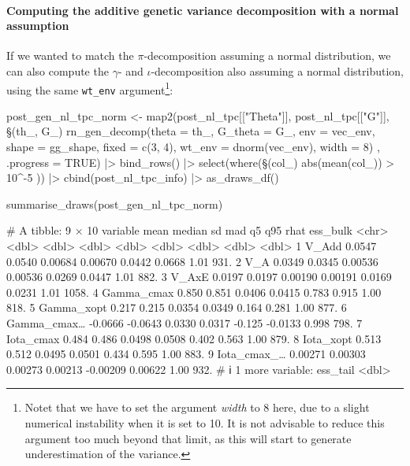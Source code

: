 \documentclass[a4paper,12pt,twoside]{article}
\begin{document}
\paragraph{Computing the additive genetic variance decomposition with a normal assumption}
If we wanted to match the $\pi$-decomposition assuming a normal distribution, we can also compute the $\gamma$- and $\iota$-decomposition also assuming a normal distribution, using the same \texttt{wt\_env} argument\footnote{Notet that we have to set the argument \textit{width} to 8 here, due to a slight numerical instability when it is set to 10. It is not advisable to reduce this argument too much beyond that limit, as this will start to generate underestimation of the variance.}:
\begin{Rinput}
post_gen_nl_tpc_norm <-
    map2(post_nl_tpc[["Theta"]], post_nl_tpc[["G"]],
         \§§(th_, G_) { rn_gen_decomp(theta    = th_,
                                    G_theta  = G_,
                                    env      = vec_env,
                                    shape    = gg_shape,
                                    fixed    = c(3, 4),
                                    wt_env   = dnorm(vec_env),
                                    width    = 8) },
         .progress = TRUE) |>
    bind_rows() |>
    select(where(\§§(col_) { abs(mean(col_)) > 10^-5 })) |>
    cbind(post_nl_tpc_info) |>
    as_draws_df()

summarise_draws(post_gen_nl_tpc_norm)
\end{Rinput}
\begin{Routput}
# A tibble: 9 × 10
  variable        mean   median      sd     mad       q5      q95  rhat ess_bulk
  <chr>          <dbl>    <dbl>   <dbl>   <dbl>    <dbl>    <dbl> <dbl>    <dbl>
1 V_Add        0.0547   0.0540  0.00684 0.00670  0.0442   0.0668  1.01      931.
2 V_A          0.0349   0.0345  0.00536 0.00536  0.0269   0.0447  1.01      882.
3 V_AxE        0.0197   0.0197  0.00190 0.00191  0.0169   0.0231  1.01     1058.
4 Gamma_cmax   0.850    0.851   0.0406  0.0415   0.783    0.915   1.00      818.
5 Gamma_xopt   0.217    0.215   0.0354  0.0349   0.164    0.281   1.00      877.
6 Gamma_cmax… -0.0666  -0.0643  0.0330  0.0317  -0.125   -0.0133  0.998     798.
7 Iota_cmax    0.484    0.486   0.0498  0.0508   0.402    0.563   1.00      879.
8 Iota_xopt    0.513    0.512   0.0495  0.0501   0.434    0.595   1.00      883.
9 Iota_cmax_…  0.00271  0.00303 0.00273 0.00213 -0.00209  0.00622 1.00      932.
# ℹ 1 more variable: ess_tail <dbl>
\end{Routput}
\end{document}
